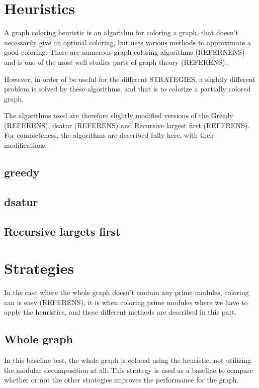 \documentclass{amsart}
\begin{document}
\section{Heuristics}

A graph coloring heuristic is an algorithm for coloring a graph, that doesn't
necessarily give an optimal coloring, but uses various methods to approximate a
good coloring. There are numerous graph coloring algorithms (REFERNENS) and is
one of the most well studies parts of graph theory (REFERENS). 

However, in order of be useful for the different STRATEGIES, a slightly
different problem is solved by these algorithms, and that is to colorize a
partially colored graph.

The algorithms used are therefore slightly modified versions of the 
Greedy (REFERENS), dsatur (REFERENS) and Recursive largest first (REFERENS). For
completeness, the algorithms are described fully here, with their modifications.



\subsection{greedy}


\subsection{dsatur}


\subsection{Recursive largets first}


\section{Strategies}

In the case where the whole graph doesn't contain any prime modules, coloring
can is easy (REFERENS), it is when coloring prime modules where we have to apply
the heuristics, and these different methods are described in this part.

\subsection{Whole graph}

In this baseline test, the whole graph is colored using the heuristic, not
utilizing the modular decomposition at all. This strategy is used as a baseline
to compare whether or not the other strategies improves the performance for the
graph.
\end{document}
